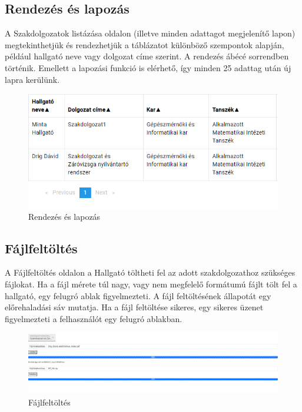 
\subsection{Rendezés és lapozás}

A Szakdolgozatok listázása oldalon (illetve minden adattagot megjelenítő lapon) megtekinthetjük és rendezhetjük a táblázatot különböző szempontok alapján, például hallgató neve vagy dolgozat címe szerint. A rendezés ábécé sorrendben történik. Emellett a lapozási funkció is elérhető, így minden 25 adattag után új lapra kerülünk.

\begin{figure}[h]
\centering
\includegraphics[width=\textwidth]{images/Orderby_pagination.png}
\caption{Rendezés és lapozás}
\label{fig:Orderby_pagination}
\end{figure}

\subsection{Fájlfeltöltés}

A Fájlfeltöltés oldalon a Hallgató töltheti fel az adott szakdolgozathoz szükséges fájlokat. Ha a fájl mérete túl nagy, vagy nem megfelelő formátumú fájlt tölt fel a hallgató, egy felugró ablak figyelmezteti. A fájl feltöltésének állapotát egy előrehaladási sáv mutatja. Ha a fájl feltöltése sikeres, egy sikeres üzenet figyelmezteti a felhasználót egy felugró ablakban.


\begin{figure}[h]
\centering
\includegraphics[width=\textwidth]{images/Upload_files.png}
\caption{Fájlfeltöltés}
\label{fig:Upload_files}
\end{figure}




